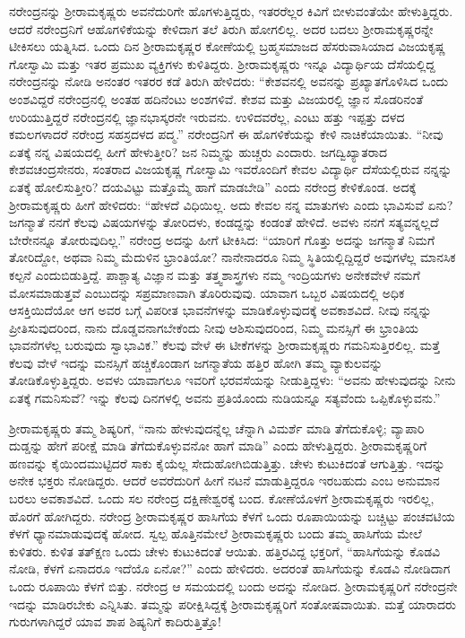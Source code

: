 ನರೇಂದ್ರನನ್ನು ಶ‍್ರೀರಾಮಕೃಷ್ಣರು ಅವನೆದುರಿಗೇ ಹೊಗಳುತ್ತಿದ್ದರು, ಇತರರೆಲ್ಲರ ಕಿವಿಗೆ ಬೀಳುವಂತೆಯೇ ಹೇಳುತ್ತಿದ್ದರು. ಆದರೆ ನರೇಂದ್ರನಿಗೆ ಆ\break ಹೊಗಳಿಕೆಯನ್ನು ಕೇಳಿದಾಗ ತಲೆ ತಿರುಗಿ ಹೋಗಲಿಲ್ಲ. ಅದರ ಬದಲು ಶ‍್ರೀರಾಮಕೃಷ್ಣ\-ರನ್ನೇ ಟೀಕಿಸಲು ಯತ್ನಿಸಿದ. ಒಂದು ದಿನ ಶ‍್ರೀರಾಮಕೃಷ್ಣರ ಕೋಣೆಯಲ್ಲಿ ಬ್ರಹ್ಮಸಮಾಜದ ಹೆಸರುವಾಸಿಯಾದ ವಿಜಯಕೃಷ್ಣ ಗೋಸ್ವಾಮಿ ಮತ್ತು ಇತರ ಪ್ರಮುಖ ವ್ಯಕ್ತಿಗಳು ಕುಳಿತಿದ್ದರು. ಶ‍್ರೀರಾಮಕೃಷ್ಣರು ಇನ್ನೂ ವಿದ್ಯಾರ್ಥಿಯ ದೆಸೆಯಲ್ಲಿದ್ದ ನರೇಂದ್ರನನ್ನು ನೋಡಿ ಅನಂತರ ಇತರರ ಕಡೆ ತಿರುಗಿ ಹೇಳಿದರು: “ಕೇಶವನಲ್ಲಿ ಅವನನ್ನು ಪ್ರಖ್ಯಾತಗೊಳಿಸಿದ ಒಂದು ಅಂಶವಿದ್ದರೆ ನರೇಂದ್ರನಲ್ಲಿ ಅಂತಹ ಹದಿನೆಂಟು ಅಂಶಗಳಿವೆ. ಕೇಶವ ಮತ್ತು ವಿಜಯರಲ್ಲಿ ಜ್ಞಾನ ಸೊಡರಿನಂತೆ ಉರಿಯುತ್ತಿದ್ದರೆ ನರೇಂದ್ರನಲ್ಲಿ ಜ್ಞಾನಭಾಸ್ಕರನೇ ಇರುವನು. ಉಳಿದವರೆಲ್ಲ, ಎಂಟು ಹತ್ತು ಇಪ್ಪತ್ತು ದಳದ ಕಮಲಗಳಾದರೆ ನರೇಂದ್ರ ಸಹಸ್ರದಳದ ಪದ್ಮ.” ನರೇಂದ್ರನಿಗೆ ಈ ಹೊಗಳಿಕೆಯನ್ನು ಕೇಳಿ ನಾಚಿಕೆಯಾಯಿತು. “ನೀವು ಏತಕ್ಕೆ ನನ್ನ ವಿಷಯದಲ್ಲಿ ಹೀಗೆ ಹೇಳುತ್ತೀರಿ? ಜನ ನಿಮ್ಮನ್ನು ಹುಚ್ಚರು ಎಂದಾರು. ಜಗದ್ವಿಖ್ಯಾತರಾದ ಕೇಶವಚಂದ್ರಸೇನರು, ಸಂತರಾದ ವಿಜಯಕೃಷ್ಣ ಗೋಸ್ವಾಮಿ ಇವರೊಂದಿಗೆ ಕೇವಲ ವಿದ್ಯಾರ್ಥಿ ದೆಸೆಯಲ್ಲಿರುವ ನನ್ನನ್ನು ಏತಕ್ಕೆ ಹೋಲಿಸುತ್ತೀರಿ? ದಯವಿಟ್ಟು ಮತ್ತೊಮ್ಮೆ ಹಾಗೆ ಮಾಡಬೇಡಿ” ಎಂದು ನರೇಂದ್ರ ಕೇಳಿಕೊಂಡ. ಅದಕ್ಕೆ ಶ‍್ರೀರಾಮಕೃಷ್ಣರು ಹೀಗೆ ಹೇಳಿದರು: “ಹೇಳದೆ ವಿಧಿಯಿಲ್ಲ. ಅದು ಕೇವಲ ನನ್ನ ಮಾತುಗಳು ಎಂದು ಭಾವಿಸುವೆ ಏನು? ಜಗನ್ಮಾತೆ ನನಗೆ ಕೆಲವು ವಿಷಯಗಳನ್ನು ತೋರಿದಳು, ಕಂಡದ್ದನ್ನು ಕಂಡಂತೆ ಹೇಳಿದೆ. ಅವಳು ನನಗೆ ಸತ್ಯವನ್ನಲ್ಲದೆ ಬೇರೇನನ್ನೂ ತೋರುವುದಿಲ್ಲ.” ನರೇಂದ್ರ ಅದನ್ನು ಹೀಗೆ ಟೀಕಿಸಿದ: “ಯಾರಿಗೆ ಗೊತ್ತು ಅದನ್ನು ಜಗನ್ಮಾತೆ ನಿಮಗೆ ತೋರಿದ್ದೋ, ಅಥವಾ ನಿಮ್ಮ ಮೆದುಳಿನ ಭ್ರಾಂತಿಯೋ? ನಾನೇನಾದರೂ ನಿಮ್ಮ ಸ್ಥಿತಿಯಲ್ಲಿದ್ದಿದ್ದರೆ ಅವುಗಳೆಲ್ಲ ಮಾನಸಿಕ ಕಲ್ಪನೆ ಎಂದುಬಿಡುತ್ತಿದ್ದೆ. ಪಾಶ್ಚಾತ್ಯ ವಿಜ್ಞಾನ ಮತ್ತು ತತ್ತ್ವಶಾಸ್ತ್ರಗಳು ನಮ್ಮ ಇಂದ್ರಿಯಗಳು ಅನೇಕವೇಳೆ ನಮಗೆ ಮೋಸಮಾಡುತ್ತವೆ ಎಂಬುದನ್ನು ಸಪ್ರಮಾಣವಾಗಿ ತೊರಿರುವುವು. ಯಾವಾಗ ಒಬ್ಬರ ವಿಷಯದಲ್ಲಿ ಅಧಿಕ ಆಸಕ್ತಿಯಿದೆಯೋ ಆಗ ಅವರ ಬಗ್ಗೆ ವಿಪರೀತ ಭಾವನೆಗಳನ್ನು ಮಾಡಿಕೊಳ್ಳುವುದಕ್ಕೆ ಅವಕಾಶವಿದೆ. ನೀವು ನನ್ನನ್ನು ಪ್ರೀತಿಸುವುದರಿಂದ, ನಾನು ದೊಡ್ಡವನಾಗಬೇಕೆಂದು ನೀವು ಆಶಿಸುವುದರಿಂದ, ನಿಮ್ಮ ಮನಸ್ಸಿಗೆ ಈ ಭ್ರಾಂತಿಯ ಭಾವನೆಗಳೆಲ್ಲ ಬರುವುದು ಸ್ವಾಭಾವಿಕ.” ಕೆಲವು ವೇಳೆ ಈ ಟೀಕೆಗಳನ್ನು ಶ‍್ರೀರಾಮಕೃಷ್ಣರು ಗಮನಿಸುತ್ತಿರಲಿಲ್ಲ. ಮತ್ತೆ ಕೆಲವು ವೇಳೆ ಇದನ್ನು ಮನಸ್ಸಿಗೆ ಹಚ್ಚಿಕೊಂಡಾಗ ಜಗನ್ಮಾತೆಯ ಹತ್ತಿರ ಹೋಗಿ ತಮ್ಮ ವ್ಯಾಕುಲವನ್ನು ತೋಡಿಕೊಳ್ಳುತ್ತಿದ್ದರು. ಅವಳು ಯಾವಾಗಲೂ ಇವರಿಗೆ ಭರವಸೆಯನ್ನು ನೀಡುತ್ತಿದ್ದಳು: “ಅವನು ಹೇಳುವುದನ್ನು ನೀನು ಏತಕ್ಕೆ ಗಮನಿಸುವೆ? ಇನ್ನು ಕೆಲವು ದಿನಗಳಲ್ಲಿ ಅವನು ಪ್ರತಿಯೊಂದು ನುಡಿಯನ್ನೂ ಸತ್ಯವೆಂದು ಒಪ್ಪಿಕೊಳ್ಳುವನು.”

ಶ‍್ರೀರಾಮಕೃಷ್ಣರು ತಮ್ಮ ಶಿಷ್ಯರಿಗೆ, “ನಾನು ಹೇಳುವುದನ್ನೆಲ್ಲ ಚೆನ್ನಾಗಿ ವಿಮರ್ಶೆ ಮಾಡಿ ತೆಗೆದುಕೊಳ್ಳಿ; ವ್ಯಾಪಾರಿ ದುಡ್ಡನ್ನು ಹೇಗೆ ಪರೀಕ್ಷೆ ಮಾಡಿ ತೆಗೆದುಕೊಳ್ಳುವನೋ ಹಾಗೆ ಮಾಡಿ” ಎಂದು ಹೇಳುತ್ತಿದ್ದರು. ಶ‍್ರೀರಾಮಕೃಷ್ಣರಿಗೆ ಹಣವನ್ನು ಕೈಯಿಂದ\break ಮುಟ್ಟಿದರೆ ಸಾಕು ಕೈಯೆಲ್ಲ ಸೇದುಹೋಗಿಬಿಡುತ್ತಿತ್ತು. ಚೇಳು ಕುಟುಕಿದಂತೆ ಆಗುತ್ತಿತ್ತು. ಇದನ್ನು ಅನೇಕ ಭಕ್ತರು ನೋಡಿದ್ದರು. ಆದರೆ ಅವರೆದುರಿಗೆ ಹೀಗೆ ನಟನೆ ಮಾಡುತ್ತಿದ್ದರೂ ಇರಬಹುದು ಎಂಬ ಅನುಮಾನ ಬರಲು ಅವಕಾಶವಿದೆ. ಒಂದು ಸಲ ನರೇಂದ್ರ ದಕ್ಷಿಣೇಶ್ವರಕ್ಕೆ ಬಂದ. ಕೋಣೆಯೊಳಗೆ ಶ‍್ರೀರಾಮಕೃಷ್ಣರು ಇರಲಿಲ್ಲ, ಹೊರಗೆ ಹೋಗಿದ್ದರು. ನರೇಂದ್ರ ಶ‍್ರೀರಾಮಕೃಷ್ಣರ ಹಾಸಿಗೆಯ ಕೆಳಗೆ ಒಂದು ರೂಪಾಯಿಯನ್ನು ಬಚ್ಚಿಟ್ಟು ಪಂಚವಟಿಯ ಕೆಳಗೆ ಧ್ಯಾನಮಾಡುವುದಕ್ಕೆ ಹೋದ. ಸ್ವಲ್ಪ ಹೊತ್ತಿನಮೇಲೆ ಶ‍್ರೀರಾಮಕೃಷ್ಣರು ಬಂದು ತಮ್ಮ ಹಾಸಿಗೆಯ ಮೇಲೆ ಕುಳಿತರು. ಕುಳಿತ ತತ್‍ಕ್ಷಣ ಒಂದು ಚೇಳು ಕುಟುಕಿದಂತೆ ಆಯಿತು. ಹತ್ತಿರವಿದ್ದ ಭಕ್ತರಿಗೆ, “ಹಾಸಿಗೆಯನ್ನು ಕೊಡವಿ ನೋಡಿ, ಕೆಳಗೆ ಏನಾದರೂ ಇದೆಯೊ ಏನೋ?” ಎಂದು ಹೇಳಿದರು. ಅದರಂತೆ ಹಾಸಿಗೆಯನ್ನು ಕೊಡವಿ ನೋಡಿದಾಗ ಒಂದು ರೂಪಾಯಿ ಕೆಳಗೆ ಬಿತ್ತು. ನರೇಂದ್ರ ಆ ಸಮಯದಲ್ಲಿ ಬಂದು ಅದನ್ನು ನೋಡಿದ. ಶ‍್ರೀರಾಮಕೃಷ್ಣರಿಗೆ ನರೇಂದ್ರನೇ ಇದನ್ನು ಮಾಡಿರಬೇಕು ಎನ್ನಿಸಿತು. ತಮ್ಮನ್ನು ಪರೀಕ್ಷಿಸಿದ್ದಕ್ಕೆ ಶ‍್ರೀರಾಮಕೃಷ್ಣರಿಗೆ ಸಂತೋಷವಾಯಿತು. ಮತ್ತೆ ಯಾರಾದರು ಗುರುಗಳಾಗಿದ್ದರೆ ಯಾವ ಶಾಪ ಶಿಷ್ಯನಿಗೆ ಕಾದಿರುತ್ತಿತ್ತೊ!

